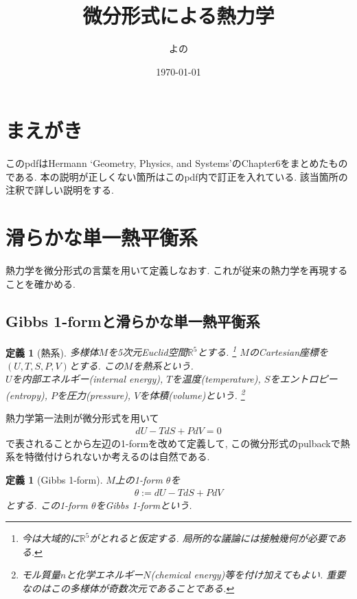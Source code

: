 \documentclass[a4paper,12pt]{ltjsarticle}
\title{微分形式による熱力学}
\author{よの}
\date{\today}
\theoremstyle{break}
\newtheorem{defn}[thm]{定義}
\newcommand{\mbr}{\mathbb{R}}
\numberwithin{equation}{section}
\begin{document}
\maketitle

\newpage

\section*{まえがき}

このpdfはHermann `Geometry, Physics, and Systems'のChapter6をまとめたものである. 
本の説明が正しくない箇所はこのpdf内で訂正を入れている. 
該当箇所の注釈で詳しい説明をする. 

\newpage

\tableofcontents

\newpage

\section{滑らかな単一熱平衡系}

熱力学を微分形式の言葉を用いて定義しなおす. 
これが従来の熱力学を再現することを確かめる. 

\subsection{Gibbs 1-formと滑らかな単一熱平衡系}

\begin{defn}[熱系]
  多様体$M$を5次元Euclid空間$\mbr^5$とする. 
    \footnote{
      今は大域的に$\mbr^5$がとれると仮定する. 
      局所的な議論には接触幾何が必要である. 
    }
  $M$のCartesian座標を$(U,T,S,P,V)$とする. 
  この$M$を熱系という. \\
  $U$を内部エネルギー(internal energy), $T$を温度(temperature), $S$をエントロピー(entropy), $P$を圧力(pressure), $V$を体積(volume)という. 
  \footnote{
    モル質量$n$と化学エネルギー$N$(chemical energy)等を付け加えてもよい. 
    重要なのはこの多様体が奇数次元であることである.
    }
\end{defn}

熱力学第一法則が微分形式を用いて
\begin{align*}
  dU - TdS + PdV 
  = 0
\end{align*}
で表されることから左辺の1-formを改めて定義して, この微分形式のpulbackで熱系を特徴付けられないか考えるのは自然である. 

\begin{defn}[Gibbs 1-form]
  $M$上の1-form $\theta$を
  \begin{align}
    \label{gibbs}
    \theta 
    := dU - TdS + PdV
  \end{align}
  とする. 
  この1-form $\theta$をGibbs 1-formという. 
\end{defn}
\end{document}
